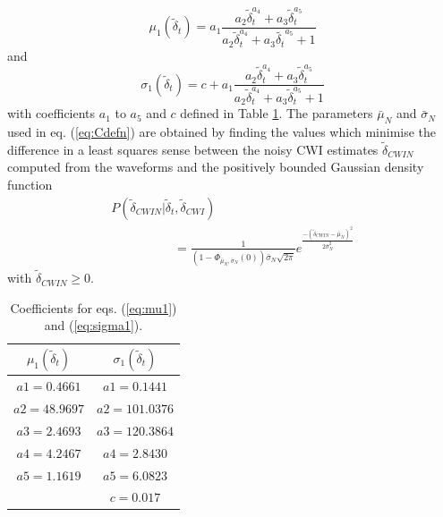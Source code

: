 \documentclass[extra]{gji}
\begin{document}
\begin{equation}
\label{eq:mu1}
\mu_1(\widetilde{\delta}_t) = a_1\frac{a_2 \widetilde{\delta}_t^{a_4}+a_3
\widetilde{\delta}_t^{a_5}}{a_2 \widetilde{\delta}_t^{a_4}+a_3 \widetilde{\delta_t}^{a_5}+1}
\end{equation}
and
\begin{equation}
\label{eq:sigma1}
\sigma_1(\widetilde{\delta}_t) = c + a_1\frac{a_2 \widetilde{\delta}_t^{a_4}+
a_3 \widetilde{\delta}_t^{a_5}}{a_2 \widetilde{\delta}_t^{a_4}+a_3 \widetilde{\delta}_t^{a_5}+1}
\end{equation}
with coefficients $a_1$ to $a_5$ and $c$ defined in Table \ref{tab-const4-mu1-sigma1}.
The parameters $\bar{\mu}_N$ and $\bar{\sigma}_N$ used in
eq. (\ref{eq:Cdefn}) are obtained by finding the values which minimise the
difference in a least squares sense between the noisy CWI estimates $\widetilde{\delta}_{CWIN}$
computed from the waveforms and the
positively bounded Gaussian density function
\begin{equation}
\label{eq-likelihood-noisydata-pdf-orig}
\begin{array}{l}
P(\widetilde{\delta}_{CWIN}|\widetilde{\delta}_t,\widetilde{\delta}_{CWI}) \\
\hspace{5em} = \frac{1}{\left(1-\Phi_{\bar{\mu}_N,\bar{\sigma}_N}(0)\right)\bar{\sigma}_N\sqrt{2\pi}}
e^{  \frac{-(\widetilde{\delta}_{CWIN}-\bar{\mu}_N)^2}{2\bar{\sigma}_N^2}  }
\end{array}
\end{equation}
with $\widetilde{\delta}_{CWIN} \geq 0$.


\begin{table}
\caption{Coefficients for eqs. (\ref{eq:mu1}) and (\ref{eq:sigma1}).}
\label{tab-const4-mu1-sigma1}
\begin{tabular}{|c|c|}
\hline
$\mu_1(\widetilde{\delta}_t)$ & $\sigma_1(\widetilde{\delta}_t)$ \\
\hline
$a1 = 0.4661$ & $a1 = 0.1441$\\
$a2 = 48.9697$ & $a2 = 101.0376$\\
$a3 = 2.4693$ & $a3 = 120.3864$\\
$a4 = 4.2467$ & $a4 = 2.8430$\\
$a5 = 1.1619$ & $a5 = 6.0823$ \\
     & $c = 0.017$ \\
\hline
\end{tabular}
\end{table}
\end{document}
